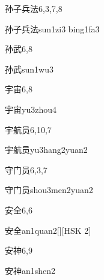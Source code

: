 \begin{entry}{孙子兵法}{6,3,7,8}
  \begin{phonetics}{孙子兵法}{sun1zi3 bing1fa3}
  \end{phonetics}
\end{entry}

\begin{entry}{孙武}{6,8}
  \begin{phonetics}{孙武}{sun1wu3}
  \end{phonetics}
\end{entry}

\begin{entry}{宇宙}{6,8}
  \begin{phonetics}{宇宙}{yu3zhou4}
  \end{phonetics}
\end{entry}

\begin{entry}{宇航员}{6,10,7}
  \begin{phonetics}{宇航员}{yu3hang2yuan2}
  \end{phonetics}
\end{entry}

\begin{entry}{守门员}{6,3,7}
  \begin{phonetics}{守门员}{shou3men2yuan2}
  \end{phonetics}
\end{entry}

\begin{entry}{安全}{6,6}
  \begin{phonetics}{安全}{an1quan2}[][HSK 2]
  \end{phonetics}
\end{entry}

\begin{entry}{安神}{6,9}
  \begin{phonetics}{安神}{an1shen2}
  \end{phonetics}
\end{entry}


